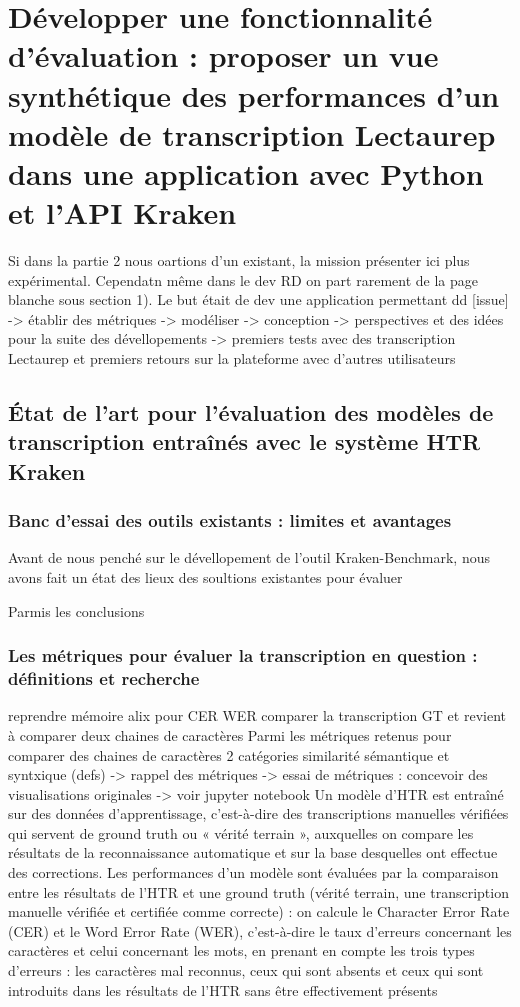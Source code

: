 \part{Développer une fonctionnalité d'évaluation : proposer un vue synthétique des performances d'un modèle de transcription Lectaurep dans une application avec Python et l'API Kraken}\label{partie_3}

Si dans la partie 2 nous oartions d'un existant, la mission présenter ici plus expérimental. Cependatn même dans le dev RD on part rarement de la page blanche sous section 1).
Le but était de dev une application permettant dd [issue]
-> établir des métriques
-> modéliser 
-> conception 
-> perspectives et des idées pour la suite des dévellopements 
-> premiers tests avec des transcription Lectaurep et premiers retours sur la plateforme avec d'autres utilisateurs 

\chapter{État de l'art pour l'évaluation des modèles de transcription entraînés avec le système HTR Kraken}

\section{Banc d'essai des outils existants : limites et avantages}

Avant de nous penché sur le dévellopement de l'outil Kraken-Benchmark, nous avons fait un état des lieux des soultions existantes pour évaluer 

Parmis les conclusions 

\section{Les métriques pour évaluer la transcription en question : définitions et recherche}

reprendre mémoire alix pour CER WER
comparer la transcription GT et revient à comparer deux chaines de caractères
Parmi les métriques retenus pour comparer des chaines de caractères 2 catégories similarité sémantique et syntxique (defs)
-> rappel des métriques
-> essai de métriques : concevoir des visualisations originales 
-> voir jupyter notebook
Un modèle d’HTR est entraîné sur des données d’apprentissage, c’est-à-dire des transcriptions manuelles vérifiées qui servent de ground truth ou « vérité terrain », auxquelles on compare les résultats de la reconnaissance automatique et sur la base desquelles ont effectue des corrections. Les performances d’un modèle sont évaluées par la comparaison entre les résultats
de l’HTR et une ground truth (vérité terrain, une transcription manuelle vérifiée et
certifiée comme correcte) : on calcule le Character Error Rate (CER) et le Word Error
Rate (WER), c’est-à-dire le taux d’erreurs concernant les caractères et celui concernant
les mots, en prenant en compte les trois types d’erreurs : les caractères mal reconnus,
ceux qui sont absents et ceux qui sont introduits dans les résultats de l’HTR sans être effectivement présents


